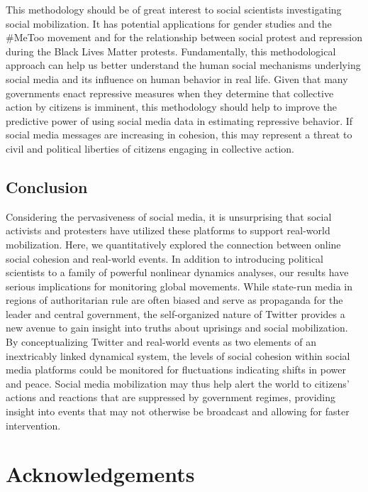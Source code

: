 \documentclass[
  english,
  man]{apa6}
\begin{document}
This methodology should be of great interest to social scientists investigating
social mobilization. It has potential applications for gender studies and
the \#MeToo movement and for the relationship between social protest and repression
during the Black Lives Matter protests. Fundamentally, this methodological
approach can help us better understand the human social mechanisms underlying
social media and its influence on human behavior in real life. Given that many
governments enact repressive measures when they determine that collective action
by citizens is imminent, this methodology should help to improve the predictive
power of using social media data in estimating repressive behavior. If social
media messages are increasing in cohesion, this may represent a threat to civil
and political liberties of citizens engaging in collective action.

\hypertarget{conclusion}{%
\subsection{Conclusion}\label{conclusion}}

Considering the pervasiveness of social media, it is unsurprising that social
activists and protesters have utilized these platforms to support real-world
mobilization. Here, we quantitatively explored the connection between online
social cohesion and real-world events. In addition to introducing political
scientists to a family of powerful nonlinear dynamics analyses, our results have
serious implications for monitoring global movements. While state-run media in
regions of authoritarian rule are often biased and serve as propaganda for the
leader and central government, the self-organized nature of Twitter provides a
new avenue to gain insight into truths about uprisings and social mobilization.
By conceptualizing Twitter and real-world events as two elements of an
inextricably linked dynamical system, the levels of social cohesion within
social media platforms could be monitored for fluctuations indicating shifts in
power and peace. Social media mobilization may thus help alert the world to
citizens' actions and reactions that are suppressed by government regimes,
providing insight into events that may not otherwise be broadcast and allowing
for faster intervention.

\hypertarget{acknowledgements}{%
\section{Acknowledgements}\label{acknowledgements}}
\end{document}
